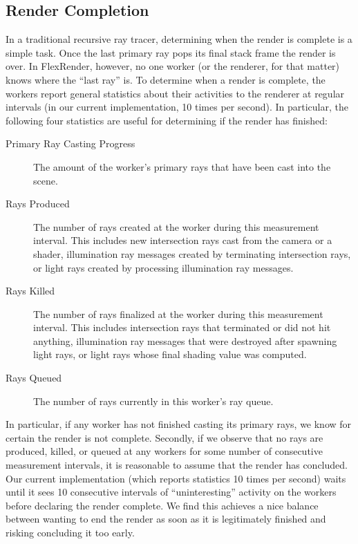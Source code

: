 \documentclass[a4paper,twoside]{article}
\begin{document}
\subsection{Render Completion}
\label{completion}

In a traditional recursive ray tracer, determining when the render is complete
is a simple task. Once the last primary ray pops its final stack frame
the render is over. In FlexRender, however, no one worker (or the renderer, for
that matter) knows where the ``last ray'' is. To determine when a render is
complete,  the workers report general statistics
about their activities to the renderer at regular intervals (in our current
implementation, 10 times per second). In particular, the following four
statistics are useful for determining if the render has finished:

\begin{description}
   \item[Primary Ray Casting Progress] The amount of the worker's primary rays
      that have been cast into the scene.
   \item[Rays Produced] The number of rays created at the worker during this
      measurement interval. This includes new intersection rays cast from the
      camera or a shader, illumination ray messages created by terminating intersection
      rays, or light rays created by processing illumination ray messages.
   \item[Rays Killed] The number of rays finalized at the worker during this
      measurement interval. This includes intersection rays that terminated or
      did not hit anything, illumination ray messages that were destroyed after spawning
      light rays, or light rays whose final shading value was computed.
   \item[Rays Queued] The number of rays currently in this worker's ray queue.
\end{description}

In particular, if any worker has not finished casting its primary rays, we
know for certain the render is not complete. Secondly, if we observe that no
rays are produced, killed, or queued at any workers for some number of
consecutive measurement intervals, it is reasonable to assume that the render
has concluded. Our current implementation (which reports statistics 10 times per second)
waits until it sees 10 consecutive intervals of ``uninteresting'' activity on
the workers before declaring the render complete. We find this achieves a nice
balance between wanting to end the render as soon as it is legitimately
finished and risking concluding it too early.
\end{document}

